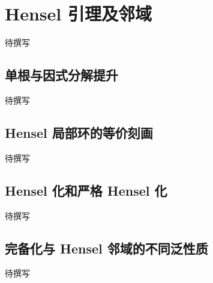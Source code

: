 
% 
% 

\section{Hensel 引理及邻域}
\label{g5:sec:1504}

待撰写

\subsection{单根与因式分解提升}
\label{g5:subsec:1504:01}
待撰写

\subsection{Hensel 局部环的等价刻画}
\label{g5:subsec:1504:02}
待撰写

\subsection{Hensel 化和严格 Hensel 化}
\label{g5:subsec:1504:03}
待撰写

\subsection{完备化与 Hensel 邻域的不同泛性质}
\label{g5:subsec:1504:04}
待撰写
